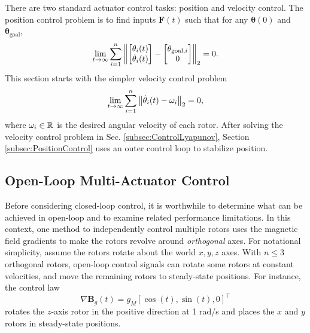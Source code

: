 There are two standard actuator control tasks: position and velocity control. 
The position control problem is to find inputs $\mathbf{F}(t)$ such that for any $\bm{\theta}(0)$ and $\bm{\theta}_{\textrm{goal}}$, 
\begin{equation}\lim_{t \to \infty}\sum_{i=1}^n \left\lVert\begin{bmatrix}\theta_i(t)\\ \dot{\theta}_i(t)\end{bmatrix}-\begin{bmatrix}\theta_{\textrm{goal},i}\\ 0 \end{bmatrix} \right\rVert_2 = 0.
\end{equation}
This section starts with the simpler velocity control problem
\begin{equation}
\lim_{t \to \infty}\sum_{i=1}^n \left\lVert \dot{\theta}_i(t)- \omega_i \right\rVert_2 = 0,
\end{equation}
where $\omega_i \in \mathbb{R}$ is the desired angular velocity of each rotor. After solving the velocity control problem in Sec. \ref{subsec:ControlLyapunov},   Section \ref{subsec:PositionControl} uses an outer control loop to stabilize position.




\subsection{Open-Loop Multi-Actuator Control}
Before considering closed-loop control, it is worthwhile to determine what can be achieved in open-loop and to examine related performance limitations.  In this context, one method to independently control multiple rotors uses the magnetic field gradients to make the rotors revolve around \emph{orthogonal} axes. For notational simplicity, assume the rotors rotate about the world $x,y,z$ axes.
With $n\le3$ orthogonal rotors,  open-loop control signals can rotate some rotors at constant velocities, and move the remaining rotors to steady-state positions.  For instance, the control law
\begin{equation}
\nabla  \mathbf{B}_g(t) = g_{M} \left[  \cos(t), \sin(t), 0  \right]^\intercal
\end{equation}
rotates the $z$-axis rotor in the positive direction at 1 rad/s  and places the $x$ and $y$ rotors in steady-state positions.

